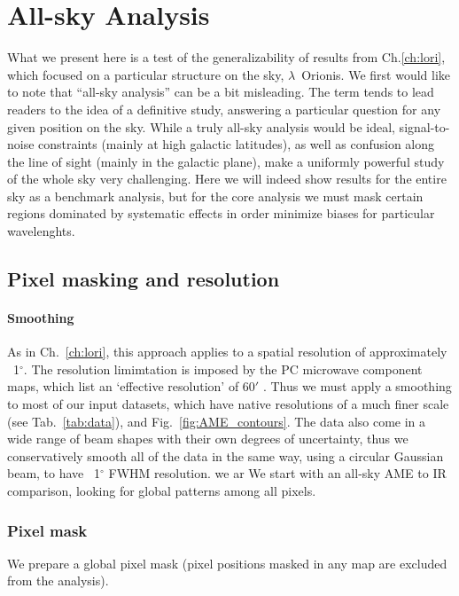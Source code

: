 \chapter{All-sky Analysis}
  \label{sec:analysis}
    What we present here is a test of the generalizability of results from Ch.\ref{ch:lori}, which focused on a particular structure on the sky, $\lambda$~Orionis.
    We first would like to note that ``all-sky analysis'' can be a bit misleading. The term tends to lead readers to the idea of a definitive study, answering a particular question for any given position on the sky.  While a truly all-sky analysis would be ideal, signal-to-noise constraints (mainly at high galactic latitudes), as well as confusion along the line of sight (mainly in the galactic plane), make a uniformly powerful study of the whole sky very challenging. Here we will indeed show results for the entire sky as a benchmark analysis, but for the core analysis we must mask certain regions dominated by systematic effects in order minimize biases for particular wavelenghts.

\section{Pixel masking and resolution}
    \subsubsection{Smoothing}
        As in Ch.~\ref{ch:lori}, this approach applies to a spatial resolution of approximately ~1$^{\circ}$. The resolution limimtation is imposed by the PC microwave component maps, which list an `effective resolution' of 60$'$ \citep{planck15X}. Thus we must apply a smoothing to most of our input datasets, which have native resolutions of a much finer scale (see Tab.~\ref{tab:data}), and Fig.~\ref{fig:AME_contours}. The data also come in a wide range of beam shapes with their own degrees of uncertainty, thus we conservatively smooth all of the data in the same way, using a circular Gaussian beam, to have ~1$^{\circ}$ FWHM resolution. we ar We start with an all-sky AME to IR comparison, looking for global patterns among all pixels.

    \subsection{Pixel mask}
        We prepare a global pixel mask (pixel positions masked in any map are excluded from the analysis).

